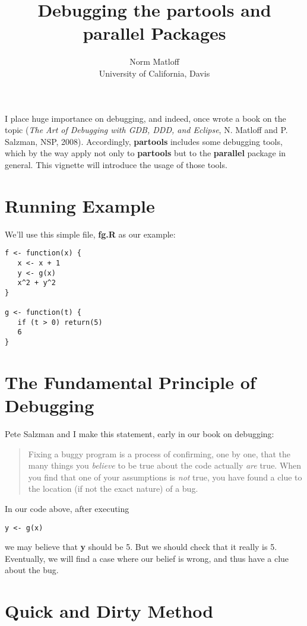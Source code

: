 \documentclass[11pt]{article}\usepackage[]{graphicx}\usepackage[]{color}
\title{{\bf Debugging the partools and parallel Packages}}
\author{Norm Matloff \\
University of California, Davis}
\begin{document}
\maketitle

I place huge importance on debugging, and indeed, once wrote a book on
the topic ({\it The Art of Debugging with GDB, DDD, and Eclipse}, N.
Matloff and P. Salzman, NSP, 2008). Accordingly, {\bf partools} includes
some debugging tools, which by the way apply not only to {\bf partools}
but to the {\bf parallel} package in general.  This vignette will
introduce the usage of those tools.

\section{Running Example}

We'll use this simple file, {\bf fg.R} as our example:

\begin{verbatim}
f <- function(x) {
   x <- x + 1
   y <- g(x)
   x^2 + y^2
}

g <- function(t) {
   if (t > 0) return(5)
   6
}
\end{verbatim}

\section{The Fundamental Principle of Debugging}

Pete Salzman and I make this statement, early in our book on debugging:

\begin{quote}
Fixing a buggy program is a process of confirming, one by one, that the
many things you {\it believe} to be true about the code actually {\it
are} true.  When you find that one of your assumptions is {\it not}
true, you have found a clue to the location (if not the exact nature) of
a bug.
\end{quote} 
In our code above, after executing

\begin{verbatim}
y <- g(x)
\end{verbatim}

we may believe that {\bf y} should be 5. But we should check that it
really is 5. Eventually, we will find a case where our belief is wrong,
and thus have a clue about the bug.

\section{Quick and Dirty Method}
\end{document}
